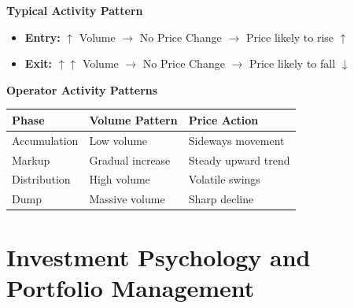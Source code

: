 \documentclass[12pt]{article}
\begin{document}
\textbf{Typical Activity Pattern}

\begin{itemize}
    \item \textbf{Entry:} $\uparrow$ Volume $\rightarrow$ No Price Change $\rightarrow$ Price likely to rise $\uparrow$
    \item \textbf{Exit:} $\uparrow\uparrow$ Volume $\rightarrow$ No Price Change $\rightarrow$ Price likely to fall $\downarrow$
\end{itemize}

\textbf{Operator Activity Patterns}
\begin{center}
\begin{tabular}{|l|l|l|}
\hline
\textbf{Phase} & \textbf{Volume Pattern} & \textbf{Price Action} \\ \hline
Accumulation & Low volume & Sideways movement \\ \hline
Markup & Gradual increase & Steady upward trend \\ \hline
Distribution & High volume & Volatile swings \\ \hline
Dump & Massive volume & Sharp decline \\ \hline
\end{tabular}
\end{center}

\section{Investment Psychology and Portfolio Management}
\end{document}

